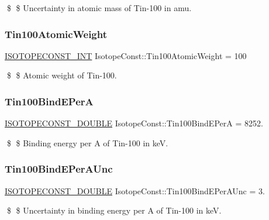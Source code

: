 \$ \$ Uncertainty in atomic mass of Tin-\/100 in amu. \mbox{\label{group___isotope_const-_tin-_sn100_gaad473209914cffb6965190ad5e835182}} 
\subsubsection{\texorpdfstring{Tin100\+Atomic\+Weight}{Tin100AtomicWeight}}
{\footnotesize\ttfamily \mbox{\hyperlink{group___isotope_const-_macros_ga5f18360b3e99483a35c32d789e62621c}{I\+S\+O\+T\+O\+P\+E\+C\+O\+N\+S\+T\+\_\+\+I\+NT}} Isotope\+Const\+::\+Tin100\+Atomic\+Weight = 100}

\$ \$ Atomic weight of Tin-\/100. \mbox{\label{group___isotope_const-_tin-_sn100_ga8947f635cc0394fc2a207687b13bc37c}} 
\subsubsection{\texorpdfstring{Tin100\+Bind\+E\+PerA}{Tin100BindEPerA}}
{\footnotesize\ttfamily \mbox{\hyperlink{group___isotope_const-_macros_ga8f45a7272ce02c0b4c65c44636ed719a}{I\+S\+O\+T\+O\+P\+E\+C\+O\+N\+S\+T\+\_\+\+D\+O\+U\+B\+LE}} Isotope\+Const\+::\+Tin100\+Bind\+E\+PerA = 8252.}

\$ \$ Binding energy per A of Tin-\/100 in keV. \mbox{\label{group___isotope_const-_tin-_sn100_ga6b4942fe51ba80f3815ff40b0ca7ba62}} 
\subsubsection{\texorpdfstring{Tin100\+Bind\+E\+Per\+A\+Unc}{Tin100BindEPerAUnc}}
{\footnotesize\ttfamily \mbox{\hyperlink{group___isotope_const-_macros_ga8f45a7272ce02c0b4c65c44636ed719a}{I\+S\+O\+T\+O\+P\+E\+C\+O\+N\+S\+T\+\_\+\+D\+O\+U\+B\+LE}} Isotope\+Const\+::\+Tin100\+Bind\+E\+Per\+A\+Unc = 3.}

\$ \$ Uncertainty in binding energy per A of Tin-\/100 in keV. \mbox{\label{group___isotope_const-_tin-_sn100_gaea623d4ab0cbc20f58b73012a34fe92c}} 
